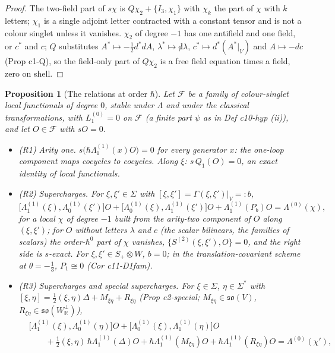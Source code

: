 \documentclass[11pt]{article}
\numberwithin{equation}{section}
\theoremstyle{plain}
\newtheorem{proposition}[theorem]{Proposition}
\theoremstyle{definition}
\begin{document}
\begin{proof}
The two-field part of $s\chi$ is $Q\chi_2+\{I_3,\chi_1\}$ with $\chi_k$ the part of $\chi$ with $k$ letters; $\chi_1$ is a single adjoint letter contracted with a constant tensor and is not a colour singlet unless it vanishes. $\chi_2$ of degree $-1$ has one antifield and one field, or $c^*$ and $c$; $Q$ substitutes $A^*\mapsto-\tfrac12d^*dA$, $\lambda^*\mapsto{\not d}\lambda$, $c^*\mapsto d^*(A^*|_V)$ and $A\mapsto-dc$ (Prop c1-Q), so the field-only part of $Q\chi_2$ is a free field equation times a field, zero on shell.
\end{proof}

\begin{proposition}[The relations at order $\hbar$]
\label{prop:qs-rel}
Let $\mathcal F$ be a family of colour-singlet local functionals of degree $0$, stable under $\Lambda$ and under the classical transformations, with $L_1^{(0)}=0$ on $\mathcal F$ (a finite part $\psi$ as in Def c10-hyp (ii)), and let $O\in\mathcal F$ with $sO=0$.
\begin{itemize}
\item (R1) Arity one. $s\big(\hbar\Lambda^{(1)}_1(x)O\big)=0$ for every generator $x$: the one-loop component maps cocycles to cocycles. Along $\xi$: $s\,Q_1(O)=0$, an exact identity of local functionals.
\item (R2) Supercharges. For $\xi,\xi'\in\Sigma$ with $[\xi,\xi']=\Gamma(\xi,\xi')|_V=:b$,
\[
\big[\Lambda^{(1)}_1(\xi),\Lambda^{(1)}_0(\xi')\big]O+\big[\Lambda^{(1)}_0(\xi),\Lambda^{(1)}_1(\xi')\big]O+\Lambda^{(1)}_1(P_b)O=\Lambda^{(0)}(\chi),
\]
for a local $\chi$ of degree $-1$ built from the arity-two component of $O$ along $(\xi,\xi')$; for $O$ without letters $\lambda$ and $c$ (the scalar bilinears, the families of scalars) the order-$\hbar^0$ part of $\chi$ vanishes, $\{S^{(2)}(\xi,\xi'),O\}=0$, and the right side is $s$-exact. For $\xi,\xi'\in S_+\otimes W$, $b=0$; in the translation-covariant scheme at $\theta=-\tfrac13$, $P_1\cong0$ (Cor c11-D1fam).
\item (R3) Supercharges and special supercharges. For $\xi\in\Sigma$, $\eta\in\Sigma^*$ with $[\xi,\eta]=\tfrac12(\xi,\eta)\Delta+M_{\xi\eta}+R_{\xi\eta}$ (Prop c2-special; $M_{\xi\eta}\in\mathfrak{so}(V)$, $R_{\xi\eta}\in\mathfrak{so}(W^\perp_{\mathbb R})$),
\[
\begin{aligned}
&\big[\Lambda^{(1)}_1(\xi),\Lambda^{(1)}_0(\eta)\big]O+\big[\Lambda^{(1)}_0(\xi),\Lambda^{(1)}_1(\eta)\big]O\\
&\qquad+\tfrac12(\xi,\eta)\,\hbar\Lambda^{(1)}_1(\Delta)O+\hbar\Lambda^{(1)}_1(M_{\xi\eta})O+\hbar\Lambda^{(1)}_1(R_{\xi\eta})O=\Lambda^{(0)}(\chi'),

\end{aligned}\]
\end{itemize}
\end{proposition}
\end{document}
